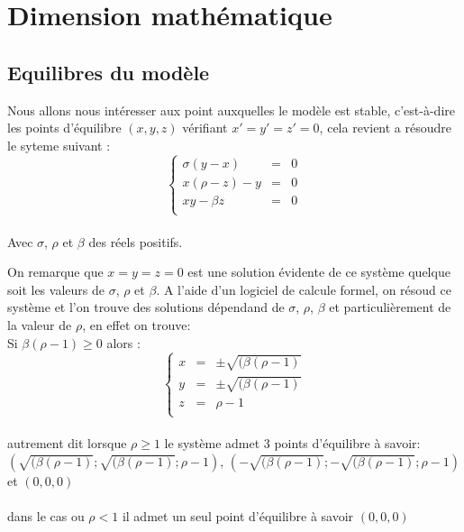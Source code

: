 \section{Dimension mathématique}

\subsection{Equilibres du modèle}
Nous allons nous intéresser aux point auxquelles le modèle est stable, c’est-à-dire les points d’équilibre $(x,y,z)$ vérifiant $x'=y'=z'=0$, cela revient a résoudre le syteme suivant :\\
\[
    \left\{
    \begin{array}{rcl}
        \sigma(y-x)&=&0\\
        x(\rho-z)-y&=&0\\
        xy-\beta z&=&0\\
    \end{array}
    \right.
\]\\

Avec $\sigma$, $\rho$ et $\beta$ des réels positifs.

On remarque que $x=y=z=0$ est une solution évidente de ce système quelque soit les valeurs de $\sigma$, $\rho$ et $\beta$.
A l'aide d'un logiciel de calcule formel, on résoud ce système et l'on trouve des solutions dépendand de $\sigma$, $\rho$, $\beta$ et particulièrement de la valeur de $\rho$, en effet on trouve:\\

Si $\beta(\rho-1)\geq 0$ alors :
\[
    \left\{
    \begin{array}{rcl}
        x&=& \pm \sqrt{(\beta(\rho-1)}\\
        y&=& \pm \sqrt{(\beta(\rho-1)}\\
        z&=&\rho-1\\
    \end{array}
    \right.
\]\\
autrement dit lorsque $\rho\geq 1$ le système admet 3 points d'équilibre à savoir:\\
 $(\sqrt{(\beta(\rho-1)}; \sqrt{(\beta(\rho-1)}; \rho-1)$, $(-\sqrt{(\beta(\rho-1)}; -\sqrt{(\beta(\rho-1)}; \rho-1)$ et $(0,0,0)$\\\\
 dans le cas ou $\rho < 1$ il admet un seul point d'équilibre à savoir $(0,0,0)$\\
 

